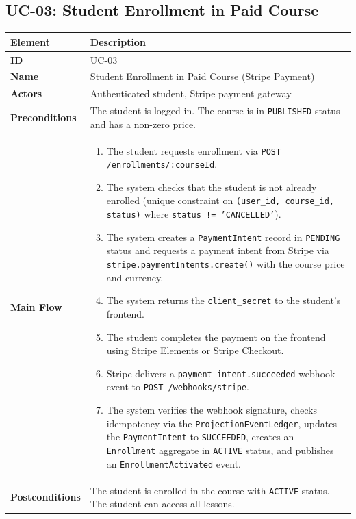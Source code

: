 \subsection{UC-03: Student Enrollment in Paid Course}

\begin{longtable}{p{3cm}p{10cm}}
  \toprule
  \textbf{Element} & \textbf{Description} \\
  \midrule
  \endhead
  \midrule
  \endfoot
  \textbf{ID} & UC-03 \\
  \textbf{Name} & Student Enrollment in Paid Course (Stripe Payment) \\
  \textbf{Actors} & Authenticated student, Stripe payment gateway \\
  \textbf{Preconditions} & The student is logged in. The course is in \texttt{PUBLISHED} status and has a non-zero price. \\
  \textbf{Main Flow} &
  \begin{enumerate}
    \item The student requests enrollment via \texttt{POST /enrollments/:courseId}.
    \item The system checks that the student is not already enrolled (unique constraint on \texttt{(user\_id, course\_id, status)} where \texttt{status != 'CANCELLED'}).
    \item The system creates a \texttt{PaymentIntent} record in \texttt{PENDING} status and requests a payment intent from Stripe via \texttt{stripe.paymentIntents.create()} with the course price and currency.
    \item The system returns the \texttt{client\_secret} to the student's frontend.
    \item The student completes the payment on the frontend using Stripe Elements or Stripe Checkout.
    \item Stripe delivers a \texttt{payment\_intent.succeeded} webhook event to \texttt{POST /webhooks/stripe}.
    \item The system verifies the webhook signature, checks idempotency via the \texttt{ProjectionEventLedger}, updates the \texttt{PaymentIntent} to \texttt{SUCCEEDED}, creates an \texttt{Enrollment} aggregate in \texttt{ACTIVE} status, and publishes an \texttt{EnrollmentActivated} event.
  \end{enumerate} \\
  \textbf{Postconditions} & The student is enrolled in the course with \texttt{ACTIVE} status. The student can access all lessons. \\

\end{longtable}
